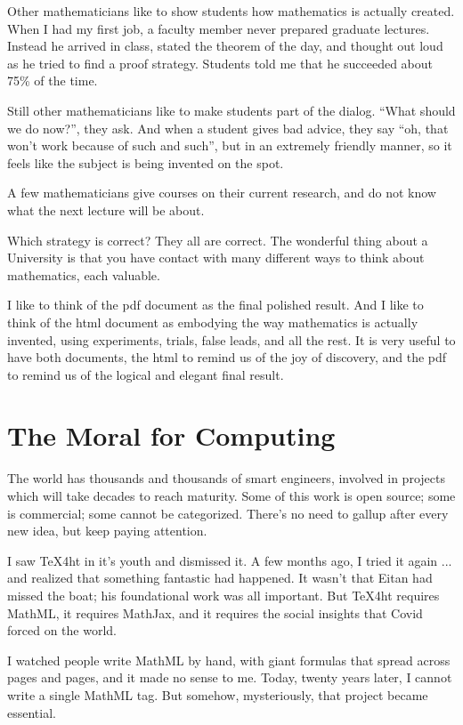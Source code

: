 \documentclass[11pt, oneside]{article}   	%
\begin{document}
Other mathematicians like to show students how mathematics is actually created. When I had my first job, a faculty member never prepared graduate lectures. Instead he arrived in class, stated the theorem of the day, and thought out loud as he tried to find a proof strategy. Students told me that he succeeded about 75\% of the time.

Still other mathematicians like to make students part of the dialog. ``What should we do now?'', they ask. And when a student gives bad advice, they say ``oh, that won't work because of such and such'', but in an extremely friendly manner, so it feels like the subject is being invented on the spot.

A few mathematicians give courses on their current research, and do not know what the next lecture will be about.

Which strategy is correct? They all are correct. The wonderful thing about a University is that you  have contact with many different ways to think about mathematics, each valuable.

I like to think of the pdf document as the final polished result. And I like to think of the html document as embodying the way mathematics is actually invented, using experiments, trials, false leads, and all the rest.
It is very useful to have both documents, the html to remind us of the joy of discovery, and the pdf to remind us of the logical and elegant final result.

\section{The Moral for Computing} 

The world has thousands and thousands of smart engineers,  involved in projects which will take decades to reach maturity. Some of this work is open source; some is commercial; some cannot be categorized. There's no need to gallup after every new idea, but keep paying attention. 

I saw TeX4ht in it's youth and dismissed it. A few months ago, I tried it again ... and  realized that something fantastic had happened. It wasn't that Eitan had missed the boat; his foundational work was all important. But TeX4ht  requires MathML, it  requires MathJax, and it requires the social insights that Covid forced on the world. 

I watched  people write MathML by hand, with giant formulas that spread across pages and pages, and it made no sense to me. Today, twenty years later, I cannot write a single MathML tag. But somehow, mysteriously, that project became essential.
\end{document}
